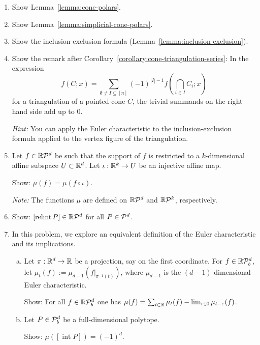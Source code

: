\begin{enumerate}
  \item Show Lemma~\ref{lemma:cone-polars}.

  \item Show Lemma~\ref{lemma:simplicial-cone-polars}.

  \item Show the inclusion-exclusion formula (Lemma~\ref{lemma:inclusion-exclusion}).

  \item Show the remark after Corollary~\ref{corollary:cone-triangulation-series}:
    In the expression
    \[
      f(C;x) = \sum_{\emptyset \neq I \subseteq [n]} (-1)^{|I| - 1} f(\bigcap_{i \in I} C_i; x)
    \]
    for a triangulation of a pointed cone $C$,
    the trivial summands on the right hand side add up to $0$.

    \emph{Hint:} You can apply the Euler characteristic to the inclusion-exclusion formula applied to the vertex figure of the triangulation.

  \item Let $f \in \mathbb{R}\mathcal{P}^d$ be such that the support of $f$ is restricted to a $k$-dimensional affine subspace $U \subset \mathbb{R}^d$.
    Let $\iota : \mathbb{R}^k \to U$ be an injective affine map.

    Show: $\mu(f) = \mu(f \circ \iota)$.

    \emph{Note:} The functions $\mu$ are defined on $\mathbb{R}\mathcal{P}^d$ and $\mathbb{R}\mathcal{P}^k$, respectively.

  \item Show: $[\operatorname{relint} P] \in \mathbb{R}\mathcal{P}^d$ for all $P \in \mathcal{P}^d$.

  \item In this problem, we explore an equivalent definition of the Euler characteristic
    and its implications.
    \begin{enumerate}[(a)]
      \item Let $\pi : \mathbb{R}^d \to \mathbb{R}$ be a projection, say on the first coordinate.
        For $f \in \mathbb{R}\mathcal{P}_b^d$, let $\mu_t(f) := \mu_{d-1}(f|_{\pi^{-1}(t)})$, where $\mu_{d-1}$ is the $(d-1)$-dimensional Euler characteristic.

        Show: For all $f \in \mathbb{R}\mathcal{P}_b^d$ one has $\mu(f) = \sum_{t \in \mathbb{R}} \mu_t(f) - \lim_{\varepsilon \downarrow 0} \mu_{t-\varepsilon}(f)$.

      \item Let $P \in \mathcal{P}_b^d$ be a full-dimensional polytope.

        Show: $\mu([\operatorname{int} P]) = (-1)^d$.


\end{enumerate}
\end{enumerate}
